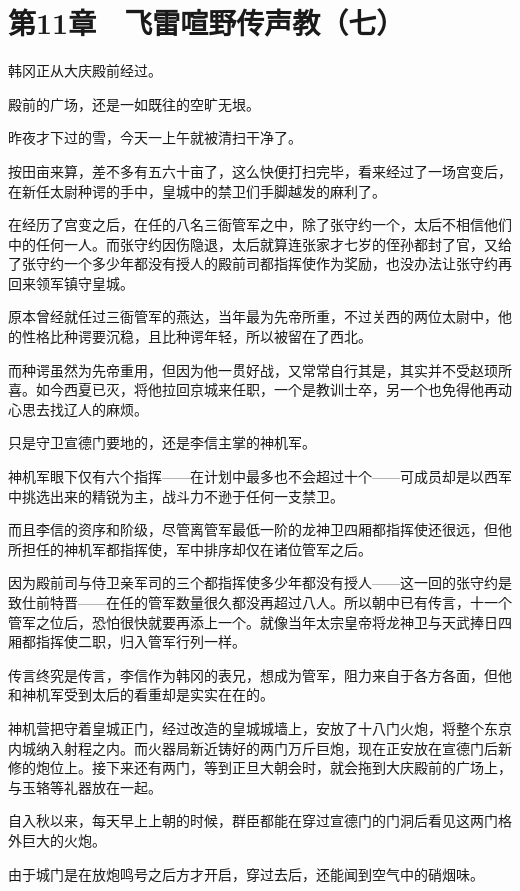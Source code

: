 \section{第11章　飞雷喧野传声教（七）}

韩冈正从大庆殿前经过。

殿前的广场，还是一如既往的空旷无垠。

昨夜才下过的雪，今天一上午就被清扫干净了。

按田亩来算，差不多有五六十亩了，这么快便打扫完毕，看来经过了一场宫变后，在新任太尉种谔的手中，皇城中的禁卫们手脚越发的麻利了。

在经历了宫变之后，在任的八名三衙管军之中，除了张守约一个，太后不相信他们中的任何一人。而张守约因伤隐退，太后就算连张家才七岁的侄孙都封了官，又给了张守约一个多少年都没有授人的殿前司都指挥使作为奖励，也没办法让张守约再回来领军镇守皇城。

原本曾经就任过三衙管军的燕达，当年最为先帝所重，不过关西的两位太尉中，他的性格比种谔要沉稳，且比种谔年轻，所以被留在了西北。

而种谔虽然为先帝重用，但因为他一贯好战，又常常自行其是，其实并不受赵顼所喜。如今西夏已灭，将他拉回京城来任职，一个是教训士卒，另一个也免得他再动心思去找辽人的麻烦。

只是守卫宣德门要地的，还是李信主掌的神机军。

神机军眼下仅有六个指挥——在计划中最多也不会超过十个——可成员却是以西军中挑选出来的精锐为主，战斗力不逊于任何一支禁卫。

而且李信的资序和阶级，尽管离管军最低一阶的龙神卫四厢都指挥使还很远，但他所担任的神机军都指挥使，军中排序却仅在诸位管军之后。

因为殿前司与侍卫亲军司的三个都指挥使多少年都没有授人——这一回的张守约是致仕前特晋——在任的管军数量很久都没再超过八人。所以朝中已有传言，十一个管军之位后，恐怕很快就要再添上一个。就像当年太宗皇帝将龙神卫与天武捧日四厢都指挥使二职，归入管军行列一样。

传言终究是传言，李信作为韩冈的表兄，想成为管军，阻力来自于各方各面，但他和神机军受到太后的看重却是实实在在的。

神机营把守着皇城正门，经过改造的皇城城墙上，安放了十八门火炮，将整个东京内城纳入射程之内。而火器局新近铸好的两门万斤巨炮，现在正安放在宣德门后新修的炮位上。接下来还有两门，等到正旦大朝会时，就会拖到大庆殿前的广场上，与玉辂等礼器放在一起。

自入秋以来，每天早上上朝的时候，群臣都能在穿过宣德门的门洞后看见这两门格外巨大的火炮。

由于城门是在放炮鸣号之后方才开启，穿过去后，还能闻到空气中的硝烟味。

